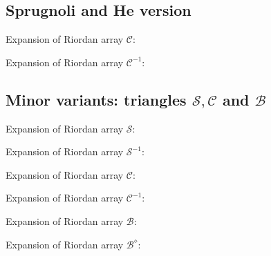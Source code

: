 \documentclass[11pt,a4paper]{article} %
\begin{document}
    \subsection{Sprugnoli and He version}

    Expansion of Riordan array $\mathcal{C}$:
    
    Expansion of Riordan array $\mathcal{C}^{-1}$:
    

    
    
    
    

    \subsection{Minor variants: triangles $\mathcal{S}, \mathcal{C}$ and $\mathcal{B}$}

    Expansion of Riordan array $\mathcal{S}$:
    
    Expansion of Riordan array $\mathcal{S}^{-1}$:
    
    Expansion of Riordan array $\mathcal{C}$:
    
    Expansion of Riordan array $\mathcal{C}^{-1}$:
    
    Expansion of Riordan array $\mathcal{B}$:
    
    Expansion of Riordan array $\mathcal{B}^{\diamond}$:
    
\end{document}
